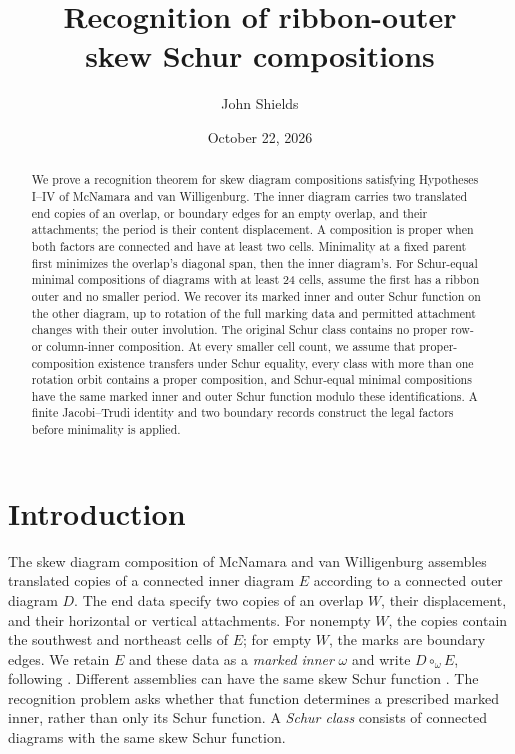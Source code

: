 \documentclass[11pt,a4paper]{amsart}
\title[Ribbon-outer recognition]{Recognition of ribbon-outer\\skew Schur compositions}
\author{John Shields}
\date{October 22, 2026}
\numberwithin{equation}{section}
\theoremstyle{plain}
\theoremstyle{definition}
\begin{document}
\begin{abstract}
We prove a recognition theorem for skew diagram compositions satisfying
Hypotheses I--IV of McNamara and van Willigenburg.  The inner diagram
carries two translated end copies of an overlap, or boundary edges for
an empty overlap, and their attachments; the period is their content
displacement.  A composition is proper when both factors are connected
and have at least two cells.  Minimality at a fixed parent first
minimizes the overlap's diagonal span, then the inner diagram's.
For Schur-equal minimal compositions of diagrams with at least 24 cells,
assume the first has a ribbon outer and no smaller period.
We recover its marked inner and outer Schur function on the other diagram,
up to rotation of the full marking data and permitted attachment changes
with their outer involution.  The original Schur class contains no proper
row- or column-inner composition.  At every smaller cell count, we assume
that proper-composition existence transfers under Schur equality, every
class with more than one rotation orbit contains a proper composition,
and Schur-equal minimal compositions have the same marked inner and
outer Schur function modulo these identifications.  A finite Jacobi--Trudi
identity and two boundary records construct the legal factors before
minimality is applied.
\end{abstract}
\maketitle

\section{Introduction}\label{sec:introduction}

The skew diagram composition of McNamara and van Willigenburg
\cite{McNamara2009Classification} assembles translated copies of a connected
inner diagram \(E\) according to a connected outer diagram \(D\).
The end data specify two copies of an overlap \(W\), their displacement,
and their horizontal or vertical attachments.  For nonempty \(W\), the
copies contain the southwest and northeast cells of \(E\); for empty
\(W\), the marks are boundary edges.  We retain \(E\) and these data as a
\emph{marked inner} \(\omega\) and write \(D\circ_\omega E\), following
\cite{Shields2026Gluing}.  Different assemblies can have the
same skew Schur function \cite{Reiner2007Coincidences}.  The recognition
problem asks whether that function determines a prescribed marked inner,
rather than only its Schur function.
A \emph{Schur class} consists of connected diagrams with the same
skew Schur function.
\end{document}
